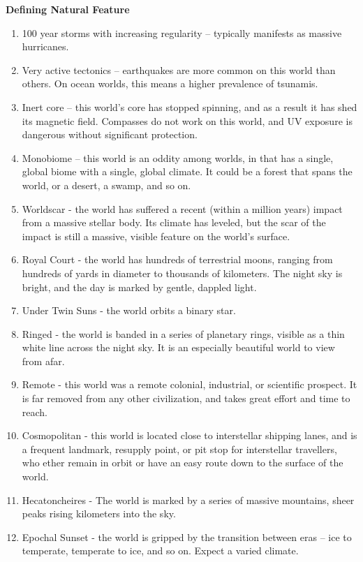 \textbf{Defining Natural Feature}
\begin{enumerate}
    \item 100 year storms with increasing regularity -- typically manifests as massive hurricanes.
    \item Very active tectonics -- earthquakes are more common on this world than others. On ocean worlds, this means a higher prevalence of tsunamis.
    \item Inert core -- this world’s core has stopped spinning, and as a result it has shed its magnetic field. Compasses do not work on this world, and UV exposure is dangerous without significant protection.
    \item Monobiome -- this world is an oddity among worlds, in that has a single, global biome with a single, global climate. It could be a forest that spans the world, or a desert, a swamp, and so on.
    \item Worldscar - the world has suffered a recent (within a million years) impact from a massive stellar body. Its climate has leveled, but the scar of the impact is still a massive, visible feature on the world’s surface.
    \item Royal Court - the world has hundreds of terrestrial moons, ranging from hundreds of yards in diameter to thousands of kilometers. The night sky is bright, and the day is marked by gentle, dappled light.
    \item Under Twin Suns - the world orbits a binary star.
    \item Ringed -  the world is banded in a series of planetary rings, visible as a thin white line across the night sky. It is an especially beautiful world to view from afar.
    \item Remote - this world was a remote colonial, industrial, or scientific prospect. It is far removed from any other civilization, and takes great effort and time to reach.
    \item Cosmopolitan - this world is located close to interstellar shipping lanes, and is a frequent landmark, resupply point, or pit stop for interstellar travellers, who ether remain in orbit or have an easy route down to the surface of the world.
    \item Hecatoncheires - The world is marked by a series of massive mountains, sheer peaks rising kilometers into the sky.
    \item Epochal Sunset - the world is gripped by the transition between eras -- ice to temperate, temperate to ice, and so on. Expect a varied climate.

\end{enumerate}

